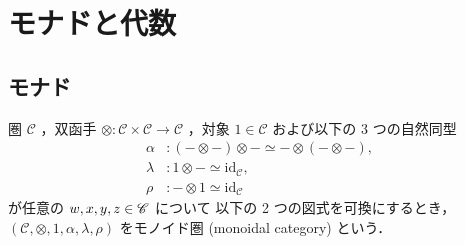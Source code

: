 \documentclass[titlepage]{ltjsreport}
\newcommand{\cat}[1]{\mathscr{#1}}
\newcommand{\obj}[1]{\lowercase{#1}}
\newcommand{\objs}[1]{#1}
\newcommand{\mrp}[3]{{#1}:{#2}\to{#3}}
\newcommand{\id}[1]{\mathrm{id}_{#1}}
\begin{document}
{

  \def\C{\cat{C}}%
  \def\D{\cat{D}}%
  \def\E{\cat{E}}%
  \def\i{1}%
  \def\F{F}%
  \def\G{G}%
  \def\w{\obj{w}}%
  \def\x{\obj{x}}%
  \def\y{\obj{y}}%
  \def\z{\obj{z}}%
  \def\monad{M}%

  \chapter{モナドと代数}

  \section{モナド}

  \begin{definition}[モノイド圏]\label{def:monoidal-category}
    圏 $\C$ ，双函手 $\mrp{\otimes}{\C\times\C}{\C}$ ，対象 $\i\in\objs{\C}$
    および以下の 3 つの自然同型
    \begin{align}
      \alpha  & :(-\otimes-)\otimes-\simeq-\otimes(-\otimes-), \\
      \lambda & :\i\otimes-\simeq\id{\C},                      \\
      \rho    & :-\otimes\i\simeq\id{\C}
    \end{align}
    が任意の $\w,\x,\y,\z\in\objs{\C}$ について
    以下の 2 つの図式を可換にするとき，
    $(\C,\otimes,\i,\alpha,\lambda,\rho)$
    をモノイド圏 (monoidal category) という．
    \begin{center}
    \end{center}
    \begin{center}
    \end{center}
  \end{definition}

}
\end{document}
